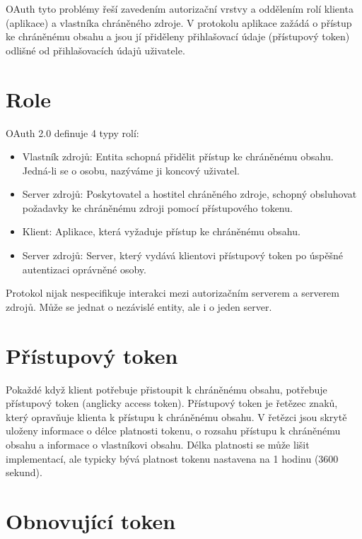 \documentclass[]{fithesis3}
\begin{document}
	OAuth tyto problémy řeší zavedením autorizační vrstvy a oddělením rolí klienta 					(aplikace) a vlastníka chráněného zdroje. V protokolu aplikace zažádá o přístup ke 				chráněnému obsahu  a jsou jí přiděleny přihlašovací údaje (přístupový token) odlišné od 			přihlašovacích údajů uživatele. 

	\section{Role}
		OAuth 2.0 definuje 4 typy rolí:

		\begin{itemize}
 		\item Vlastník zdrojů:
  		\newline
		Entita schopná přidělit přístup ke chráněnému obsahu. Jedná-li se o osobu, nazýváme ji 			koncový uživatel.
  		\item Server zdrojů:
  		\newline
		Poskytovatel a hostitel chráněného zdroje, schopný obsluhovat požadavky ke 					chráněnému zdroji pomocí přístupového tokenu.
 	 	\item Klient:
  		\newline
		Aplikace, která vyžaduje přístup ke chráněnému obsahu.
  		\item Server zdrojů:
 		\newline
		Server, který vydává klientovi přístupový token po úspěšné autentizaci oprávněné osoby.
		\end{itemize}
		Protokol nijak nespecifikuje interakci mezi autorizačním serverem a serverem zdrojů. 				Může se jednat o nezávislé entity, ale i o jeden server.

	\section{Přístupový token}	

	Pokaždé když klient potřebuje přistoupit k chráněnému obsahu, potřebuje přístupový token 			(anglicky access token). Přístupový token je řetězec znaků, který opravňuje klienta k přístupu 		k chráněnému obsahu. V řetězci jsou skrytě uloženy informace o délce platnosti tokenu, o 			rozsahu přístupu k 	chráněnému obsahu a informace o vlastníkovi obsahu. Délka platnosti se 		může lišit implementací, ale typicky bývá platnost tokenu nastavena na 1 hodinu (3600 			sekund).

	\section{Obnovující token}	
\end{document}
